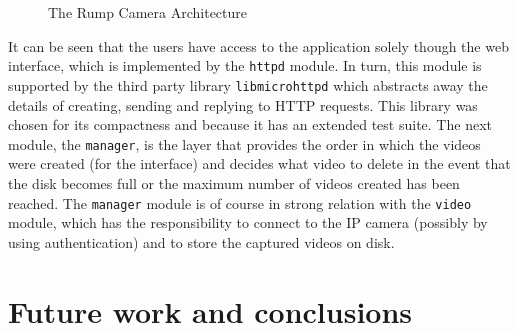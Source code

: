 \documentclass[10pt,a4paper,twoside]{article}
\begin{document}
\begin{figure}[H]
  \centering
  \caption{The Rump Camera Architecture}
  \label{fig:archdiagram}
\end{figure}

It can be seen that the users have access to the application solely though the web interface, which is implemented by
the \texttt{httpd} module. In turn, this module is supported by the third party library \texttt{libmicrohttpd} which
abstracts away the details of creating, sending and replying to HTTP requests. This library was chosen for its
compactness and because it has an extended test suite. The next module, the \texttt{manager}, is the layer that provides
the order in which the videos were created (for the interface) and decides what video to delete in the event that the
disk becomes full or the maximum number of videos created has been reached.
The \texttt{manager} module is of course in strong relation with the \texttt{video} module, which has the
responsibility to connect to the IP camera (possibly by using authentication) and to store the captured videos on disk.

\section{Future work and conclusions}
\end{document}
